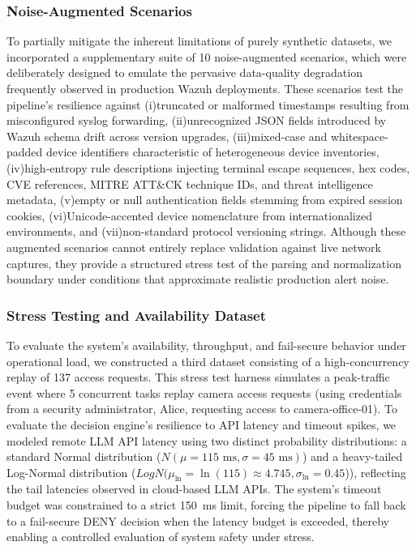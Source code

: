 \documentclass[
]{ceurart}
\begin{document}
\subsubsection{Noise-Augmented Scenarios}
To partially mitigate the inherent limitations of purely synthetic datasets, we incorporated a supplementary suite of 10 noise-augmented scenarios, which were deliberately designed to emulate the pervasive data-quality degradation frequently observed in production Wazuh deployments. These scenarios test the pipeline's resilience against (i)truncated or malformed timestamps resulting from misconfigured syslog forwarding, (ii)unrecognized JSON fields introduced by Wazuh schema drift across version upgrades, (iii)mixed-case and whitespace-padded device identifiers characteristic of heterogeneous device inventories, (iv)high-entropy rule descriptions injecting terminal escape sequences, hex codes, CVE references, MITRE ATT\&CK technique IDs, and threat intelligence metadata, (v)empty or null authentication fields stemming from expired session cookies, (vi)Unicode-accented device nomenclature from internationalized environments, and (vii)non-standard protocol versioning strings. Although these augmented scenarios cannot entirely replace validation against live network captures, they provide a structured stress test of the parsing and normalization boundary under conditions that approximate realistic production alert noise.

\subsubsection{Stress Testing and Availability Dataset}\label{sec:stress_test_dataset}
To evaluate the system's availability, throughput, and fail-secure behavior under operational load, we constructed a third dataset consisting of a high-concurrency replay of 137 access requests. This stress test harness simulates a peak-traffic event where 5 concurrent tasks replay camera access requests (using credentials from a security administrator, Alice, requesting access to camera-office-01). To evaluate the decision engine's resilience to API latency and timeout spikes, we modeled remote LLM API latency using two distinct probability distributions: a standard Normal distribution ($N(\mu=115\text{ ms}, \sigma=45\text{ ms})$) and a heavy-tailed Log-Normal distribution ($LogN(\mu_{\ln}=\ln(115)\approx4.745, \sigma_{\ln}=0.45$)), reflecting the tail latencies observed in cloud-based LLM APIs. The system's timeout budget was constrained to a strict 150~ms limit, forcing the pipeline to fall back to a fail-secure DENY decision when the latency budget is exceeded, thereby enabling a controlled evaluation of system safety under stress.
\end{document}
